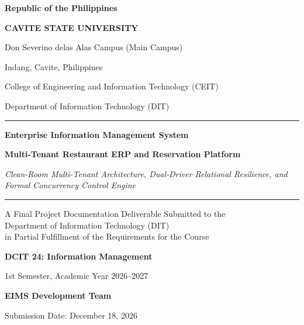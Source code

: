 \documentclass[11pt,a4paper,oneside]{report}
\begin{document}
\begin{titlepage}
    \centering
    \vspace*{1.0cm}

    {\Large\textbf{Republic of the Philippines}\par}
    \vspace{0.3cm}
    {\LARGE\bfseries\color{cvsuGreen} CAVITE STATE UNIVERSITY\par}
    {\large Don Severino delas Alas Campus (Main Campus)\par}
    {\large Indang, Cavite, Philippines\par}
    \vspace{0.8cm}
    {\large College of Engineering and Information Technology (CEIT)\par}
    {\large Department of Information Technology (DIT)\par}

    \vspace{1.5cm}
    \rule{0.8\textwidth}{1.5pt}
    \vspace{0.8cm}

    {\huge\bfseries\color{primaryNavy} Enterprise Information Management System\par}
    \vspace{0.4cm}
    {\Large\bfseries Multi-Tenant Restaurant ERP and Reservation Platform\par}
    \vspace{0.4cm}
    {\normalsize\itshape Clean-Room Multi-Tenant Architecture, Dual-Driver Relational Resilience, and Formal Concurrency Control Engine\par}

    \vspace{0.8cm}
    \rule{0.8\textwidth}{1.5pt}
    \vspace{1.5cm}

    {\large A Final Project Documentation Deliverable Submitted to the\\
    Department of Information Technology (DIT)\\
    in Partial Fulfillment of the Requirements for the Course\par}

    \vspace{0.8cm}
    {\Large\bfseries\color{primaryNavy} DCIT 24: Information Management\par}
    {\normalsize 1st Semester, Academic Year 2026--2027\par}

    \vspace{1.5cm}
    {\large\textbf{EIMS Development Team}\par}

    \vfill
    {\small\color{slateGray} Submission Date: December 18, 2026\par}
\end{titlepage}
\end{document}
